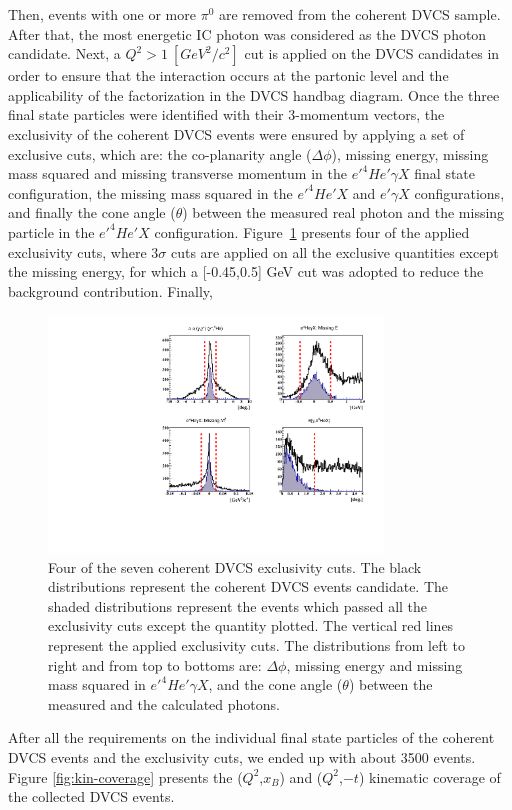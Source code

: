 \documentclass[nofootinbib,twocolumn,showpacs,prl,superscriptaddress,secnumarabic,amssymb,nobibnotes,aps,floatfix]{revtex4}
\begin{document}
Then, events with one or 
more $\pi^{0}$ are removed from the coherent DVCS sample. After that, the most 
energetic IC photon was considered as the DVCS photon candidate. Next, a 
$Q^{2}>1~[GeV^{2}/c^{2}]$ cut is applied on the DVCS candidates in order to 
ensure that the interaction occurs at the partonic level and the applicability 
of the factorization in the DVCS handbag diagram.  Once the three final state 
particles were identified with their 3-momentum vectors, the exclusivity of the 
coherent DVCS events were ensured by applying a set of exclusive cuts, which 
are: the co-planarity angle ($\Delta \phi$), missing energy, missing mass 
squared and missing transverse momentum in the $e'^4He'\gamma X$ final state 
configuration, the missing mass squared in the $e'^4He'X$ and $e'\gamma X$ 
configurations, and finally the cone angle ($\theta$) between the measured real 
photon and the missing particle in the $e'^4He'X$ configuration.  
Figure~\ref{fig:kin-cuts} presents four of the applied exclusivity cuts, where 
3$\sigma$ cuts are applied on all the exclusive quantities except the missing 
energy, for which a [-0.45,0.5] GeV cut was adopted to reduce the background 
contribution. Finally, 

\begin{figure}[tb]
\includegraphics[width=8.9cm]{figs/coh_exc_cuts.pdf}
\caption{Four of the seven coherent DVCS exclusivity cuts. The black 
distributions represent the coherent DVCS events candidate. The shaded 
distributions represent the events which passed all the exclusivity cuts except 
the quantity plotted. The vertical red lines represent the applied exclusivity 
cuts. The distributions from left to right and from top to bottoms are: $\Delta 
\phi$, missing energy and missing mass squared in $e'^4He'\gamma X$, and the 
cone angle ($\theta$) between the measured and the calculated photons.}
\label{fig:kin-cuts}
\end{figure}
After all the requirements on the individual final state particles of the 
coherent DVCS events and the exclusivity cuts, we ended up with about 3500 
events. Figure \ref{fig:kin-coverage} presents the ($Q^{2}$,$x_{B}$) and 
($Q^{2}$,$-t$) kinematic coverage of the collected DVCS events. 
\end{document}
